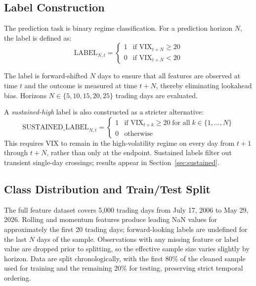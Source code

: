\documentclass[12pt]{article}
\begin{document}
\subsection{Label Construction}

The prediction task is binary regime classification. For a prediction horizon $N$, the label is defined as:
\begin{equation}
    \text{LABEL}_{N,t} = \begin{cases} 1 & \text{if } \text{VIX}_{t+N} \geq 20 \\ 0 & \text{if } \text{VIX}_{t+N} < 20 \end{cases}
    \label{eq:label}
\end{equation}

The label is forward-shifted $N$ days to ensure that all features are observed at time $t$ and the outcome is measured at time $t + N$, thereby eliminating lookahead bias. Horizons $N \in \{5, 10, 15, 20, 25\}$ trading days are evaluated.

A \emph{sustained-high} label is also constructed as a stricter alternative:
\begin{equation}
    \text{SUSTAINED\_LABEL}_{N,t} = \begin{cases} 1 & \text{if } \text{VIX}_{t+k} \geq 20 \;\text{for all}\; k \in \{1, \ldots, N\} \\ 0 & \text{otherwise} \end{cases}
    \label{eq:sustained}
\end{equation}
This requires VIX to remain in the high-volatility regime on every day from $t+1$ through $t+N$, rather than only at the endpoint. Sustained labels filter out transient single-day crossings; results appear in Section~\ref{sec:sustained}.

\subsection{Class Distribution and Train/Test Split}

The full feature dataset covers 5,000 trading days from July 17, 2006 to May 29, 2026. Rolling and momentum features produce leading NaN values for approximately the first 20 trading days; forward-looking labels are undefined for the last $N$ days of the sample. Observations with any missing feature or label value are dropped prior to splitting, so the effective sample size varies slightly by horizon. Data are split chronologically, with the first 80\% of the cleaned sample used for training and the remaining 20\% for testing, preserving strict temporal ordering.
\end{document}
